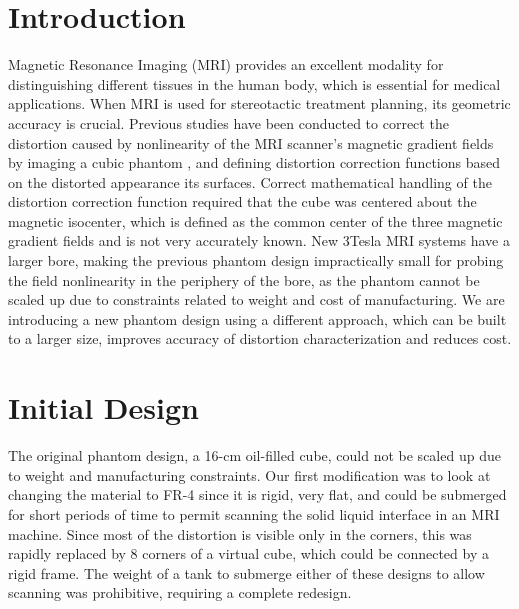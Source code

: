 \section{Introduction}

Magnetic Resonance Imaging (MRI) provides an excellent modality for distinguishing different tissues in the
human body, which is essential for medical applications. When MRI is used for stereotactic treatment planning,
its geometric accuracy is crucial. Previous studies have been conducted to correct the distortion caused by
nonlinearity of the MRI scanner’s magnetic gradient fields by imaging a cubic phantom \cite{simple_approach},
\cite{tlee_iaeng} and defining
distortion correction functions based on the distorted appearance its surfaces. Correct mathematical handling
of the distortion correction function required that the cube was centered about the magnetic isocenter, which
is defined as the common center of the three magnetic gradient fields and  is not very accurately known.
New 3Tesla MRI systems have a larger bore, making the previous phantom design impractically small for probing
the field nonlinearity in the periphery of the bore, as the phantom cannot be scaled up due to constraints
related to weight and cost of manufacturing. We are introducing a new phantom design using a different
approach, which can be built to a larger size, improves accuracy of distortion characterization and reduces
cost.

\section{Initial Design}

The original phantom design, a 16-cm oil-filled cube, could not be scaled up due to weight and manufacturing
constraints. Our first modification was to look at changing the material to FR-4 since it is rigid, very flat,
and could be submerged for short periods of time to permit scanning the solid liquid interface in an MRI
machine.  Since most of the distortion is visible only in the corners, this was rapidly replaced by 8 corners
of a virtual cube, which could be connected by a rigid frame.  The weight of a tank to submerge either of
these designs to allow scanning was prohibitive, requiring a complete redesign.

